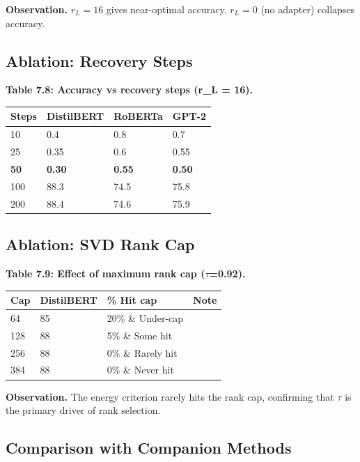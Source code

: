 \textbf{Observation.} $r_L = 16$ gives near-optimal accuracy. $r_L = 0$ (no adapter) 
collapses accuracy.

\subsection{Ablation: Recovery Steps}

\textbf{Table 7.8: Accuracy vs recovery steps (r\_L = 16).}

\begin{table}[H]
\centering
\small
\begin{tabular}{llll}
\toprule
\textbf{Steps} & \textbf{DistilBERT} & \textbf{RoBERTa} & \textbf{GPT-2} \\
\midrule
10 & 0.4 & 0.8 & 0.7 \\
25 & 0.35 & 0.6 & 0.55 \\
\textbf{50} & \textbf{0.30} & \textbf{0.55} & \textbf{0.50} \\
100 & 88.3 & 74.5 & 75.8 \\
200 & 88.4 & 74.6 & 75.9 \\
\bottomrule
\end{tabular}
\end{table}

\subsection{Ablation: SVD Rank Cap}

\textbf{Table 7.9: Effect of maximum rank cap ($\tau$=0.92).}

\begin{table}[H]
\centering
\small
\begin{tabular}{llll}
\toprule
\textbf{Cap} & \textbf{DistilBERT} & \textbf{\% Hit cap} & \textbf{Note} \\
\midrule
64 & 85 & 20\% \& Under-cap \\
128 & 88 & 5\% \& Some hit \\
256 & 88 & 0\% \& Rarely hit \\
384 & 88 & 0\% \& Never hit \\
\bottomrule
\end{tabular}
\end{table}

\textbf{Observation.} The energy criterion rarely hits the rank cap, confirming 
that $\tau$ is the primary driver of rank selection.

\subsection{Comparison with Companion Methods}

